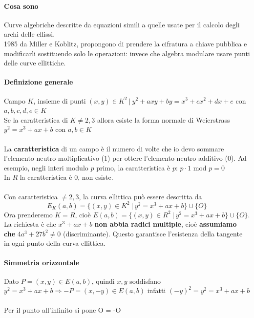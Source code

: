 \documentclass[10pt]{book}
\begin{document}
\paragraph{Cosa sono} Curve algebriche descritte da equazioni simili a quelle usate per il calcolo degli archi delle ellissi.\\
1985 da Miller e Koblitz, propongono di prendere la cifratura a chiave pubblica e modificarli sostituendo solo le operazioni: invece che algebra modulare usare punti delle curve ellittiche.
\paragraph{Definizione generale} Campo $K$, insieme di punti $(x,y)\in K^2\:|\: y^2+axy + by = x^3 + cx^2 + dx + e$ con $a,b,c,d,e\in K$\\
Se la caratteristica di $K \neq 2,3$ allora esiste la forma normale di Weierstrass $y^2 = x^3 + ax + b$ con $a,b\in K$\\\\
La \textbf{caratteristica} di un campo è il numero di volte che io devo sommare l'elemento neutro moltiplicativo (1) per ottere l'elemento neutro additivo (0). Ad esempio, negli interi modulo $p$ primo, la caratteristica è $p$: $p\cdot 1$ mod $p = 0$\\
In $R$ la caratteristica è 0, non esiste.\\\\
Con caratteristica $\neq 2,3$, la curva ellittica può essere descritta da $$E_K(a,b) = \{(x,y)\in K^2\:|\:y^2 = x^3+ax+b\}\cup\{O\}$$
Ora prenderemo $K = R$, cioè $E(a,b) = \{(x,y)\in R^2\:|\:y^2 = x^3+ax+b\}\cup\{O\}$.\\
La richiesta è che $x^3 + ax + b$ \textbf{non abbia radici multiple}, cioè \textbf{assumiamo che} $4a^3 + 27b^2 \neq 0$ (discriminante). Questo garantisce l'esistenza della tangente in ogni punto della curva ellittica.
\paragraph{Simmetria orizzontale} Dato $P = (x,y) \in E(a,b)$, quindi $x,y$ soddisfano $y^2 = x^3 + ax + b \Rightarrow -P = (x,-y)\in E(a,b)$ infatti $(-y)^2 = y^2 = x^3 + ax + b$\\\\
Per il punto all'infinito si pone O = -O
\end{document}
